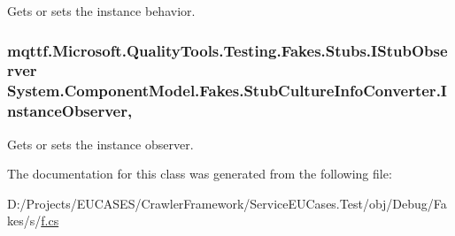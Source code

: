 Gets or sets the instance behavior.

\hypertarget{class_system_1_1_component_model_1_1_fakes_1_1_stub_culture_info_converter_aa574b994e7669f377536d6dd989731c0}{
\subsubsection[{Instance\-Observer}]{\setlength{\rightskip}{0pt plus 5cm}mqttf.\-Microsoft.\-Quality\-Tools.\-Testing.\-Fakes.\-Stubs.\-I\-Stub\-Observer System.\-Component\-Model.\-Fakes.\-Stub\-Culture\-Info\-Converter.\-Instance\-Observer\hspace{0.3cm}{\ttfamily [get]}, {\ttfamily [set]}}}\label{class_system_1_1_component_model_1_1_fakes_1_1_stub_culture_info_converter_aa574b994e7669f377536d6dd989731c0}


Gets or sets the instance observer.



The documentation for this class was generated from the following file\-:\begin{DoxyCompactItemize}
\item 
D\-:/\-Projects/\-E\-U\-C\-A\-S\-E\-S/\-Crawler\-Framework/\-Service\-E\-U\-Cases.\-Test/obj/\-Debug/\-Fakes/s/\hyperlink{s_2f_8cs}{f.\-cs}\end{DoxyCompactItemize}
